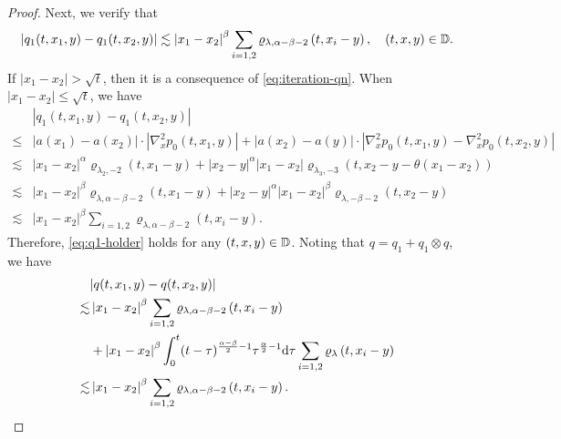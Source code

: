 \begin{proof}
    Next, we verify that 
    \begin{equation}\label{eq:q1-holder}
        \left|q_1(t,x_1,y)-q_1(t,x_2,y)\right| \lesssim \left|x_1-x_2\right|^{\beta} \sum_{i=1,2} \varrho_{\lambda, \alpha-\beta-2}\left(t, x_i-y\right), \quad (t,x,y)\in {\mathbb D}. 
    \end{equation}
    If \(|x_1-x_2|>\sqrt{t}\), then it is a consequence of \eqref{eq:iteration-qn}. When \(|x_1-x_2|\leq \sqrt{t}\), we have 
    \begin{equation*}
        \begin{aligned}
            & \left|q_1(t,x_1,y)-q_1(t,x_2,y)\right|\\
            \leq&\left|a\left(x_1\right)-a\left(x_2\right)\right| \cdot\left|\nabla_x^2 p_0(t,x_1,y)\right|+\left|a\left(x_2\right)-a(y)\right| \cdot\left|\nabla_x^2 p_0(t,x_1,y)-\nabla_x^2 p_0(t,x_2,y)\right| \\
            \lesssim&\left|x_1-x_2\right|^\alpha \varrho_{\lambda_2,-2}\left(t, x_1-y\right)+\left|x_2-y\right|^\alpha\left|x_1-x_2\right| \varrho_{\lambda_3,-3}\left(t, x_2-y-\theta\left(x_1-x_2\right)\right) \\
            \lesssim&\left|x_1-x_2\right|^{\beta} \varrho_{\lambda, \alpha-\beta-2}\left(t, x_1-y\right)+\left|x_2-y\right|^\alpha\left|x_1-x_2\right|^{\beta} \varrho_{\lambda,-\beta-2}\left(t, x_2-y\right) \\
            \lesssim&\left|x_1-x_2\right|^{\beta} \sum_{i=1,2} \varrho_{\lambda, \alpha-\beta-2}\left(t, x_i-y\right) .
        \end{aligned}
    \end{equation*}
    Therefore, \eqref{eq:q1-holder} holds for any \((t,x,y)\in {\mathbb D}\). Noting that \(q=q_1+q_1\otimes q\), we have 
    \begin{equation*}
        \begin{aligned}
            &|q(t,x_1,y)-q(t,x_2,y)|\\
            \lesssim& \left|x_1-x_2\right|^{\beta} \sum_{i=1,2} \varrho_{\lambda, \alpha-\beta-2}\left(t, x_i-y\right) \\
            &+\left|x_1-x_2\right|^{\beta}\int_0^t (t-\tau )^{\frac{\alpha-\beta}{2}-1} \tau^{\frac{\alpha}{2}-1} \text{\rm{d}} \tau  \sum_{i=1,2} \varrho_{\lambda}\left(t, x_i-y\right)\\
            \lesssim& \left|x_1-x_2\right|^{\beta} \sum_{i=1,2} \varrho_{\lambda, \alpha-\beta-2}\left(t, x_i-y\right). 
        \end{aligned}
    \end{equation*}
\end{proof}

